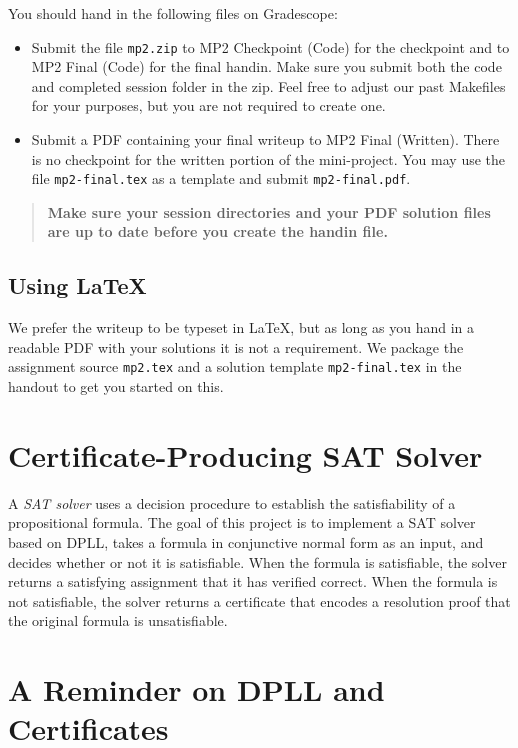 \documentclass[11pt]{article}
\begin{document}
You should hand in the following files on Gradescope:
\begin{itemize}
\item Submit the file \texttt{mp2.zip} to MP2 Checkpoint
  (Code) for the checkpoint and to MP2 Final (Code) for the
  final handin.  Make sure you submit both the code and completed session folder in the zip.
  Feel free to adjust our past Makefiles for your purposes, but you are not
  required to create one.
\item Submit a PDF containing your final writeup to
  MP2 Final (Written).  There is no checkpoint for the
  written portion of the mini-project.  You may use the file
  \texttt{mp2-final.tex} as a template and submit \texttt{mp2-final.pdf}.
\end{itemize}

\begin{quote}\bf
  Make sure your session directories and your PDF solution files are
  up to date before you create the handin file.
\end{quote}

\subsection*{Using LaTeX}

We prefer the writeup to be typeset in LaTeX, but as long as you hand in
a readable PDF with your solutions it is not a requirement.  We package
the assignment source \texttt{mp2.tex} and a solution template
\texttt{mp2-final.tex} in the handout to get you started on this.

\clearpage
\section{Certificate-Producing SAT Solver}

A \emph{SAT solver} uses a decision procedure to establish the satisfiability of a propositional formula. 
The goal of this project is to implement a SAT solver based on DPLL, takes a formula in conjunctive normal form as an input, and decides whether or not it is satisfiable.
When the formula is satisfiable, the solver returns a satisfying assignment that it has verified correct.
When the formula is not satisfiable, the solver returns a certificate that encodes a resolution proof that the original formula is unsatisfiable.

\section*{A Reminder on DPLL and Certificates}
\end{document}
